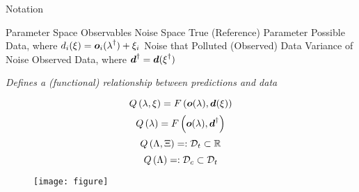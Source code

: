 \begin{block}{Notation}
\large
    \begin{itemize}
         Parameter Space
         Observables
         Noise Space
        \itembox{$\param^\dagger\in\pspace$} True (Reference) Parameter
         Possible Data, where $d_i(\operatorname*{\xi}) = \boldsymbol{o}_i(\operatorname*{\lambda}^\dagger) + \xi_i$
        \itembox{$\noise^\dagger\in\nspace$} Noise that Polluted (Observed) Data
        \itembox{$ \sigma $} Variance of Noise
         Observed Data, where $\boldsymbol{d}^\dagger = \boldsymbol{d}(\operatorname*{\xi}^\dagger)$
    \end{itemize}

\Large
    \emph{\Large Defines a (functional) relationship between predictions and data}

        $$Q \left (\operatorname*{\lambda}, \operatorname*{\xi} \right ) = F \left ( \boldsymbol{o}(\operatorname*{\lambda}), \boldsymbol{d}(\operatorname*{\xi}) \right ) $$
        $$Q \left (\operatorname*{\lambda} \right ) = F \left ( \boldsymbol{o}(\operatorname*{\lambda}), \boldsymbol{d}^\dagger \right )$$
        $$Q \left ( \Lambda, \operatorname*{\Xi} \right ) =: \mathcal{D}_t \subset \mathbb{R}$$
        $$Q \left ( \Lambda \right ) =: \mathcal{D}_c \subset \mathcal{D}_t$$
\normalsize
    \begin{figure}
        \texttt{[image: figure]}
    \end{figure}

\end{block}
\vspace{-1cm}
